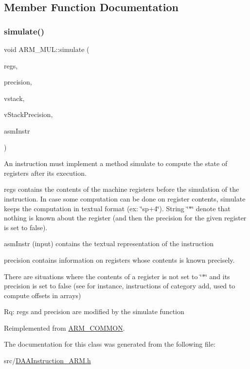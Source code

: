 \subsection{Member Function Documentation}
\mbox{\label{classARM__MUL_a57f827247b5ee156334e9963b3c6bfd4}} 
\subsubsection{\texorpdfstring{simulate()}{simulate()}}
{\footnotesize\ttfamily void A\+R\+M\+\_\+\+M\+U\+L\+::simulate (\begin{DoxyParamCaption}\item[{\hyperlink{DAAInstruction_8h_af0fae93a861de9cf37988d5673cac523}{reg\+Table} \&}]{regs,  }\item[{\hyperlink{DAAInstruction_8h_a0e8cae02815a5f8adc750122d790b455}{reg\+Precision\+Table} \&}]{precision,  }\item[{\hyperlink{DAAInstruction_8h_a1b0e70ac1a04f06c8132055ed01f589f}{stack\+Type} \&}]{vstack,  }\item[{\hyperlink{DAAInstruction_8h_ac5cb793e9dac3fa9693da78b7e29ab30}{stack\+Prec\+Type} \&}]{v\+Stack\+Precision,  }\item[{const string \&}]{asm\+Instr }\end{DoxyParamCaption})\hspace{0.3cm}{\ttfamily [virtual]}}

An instruction must implement a method simulate to compute the state of registers after its execution.

regs contains the contents of the machine registers before the simulation of the instruction. In case some computation can be done on register contents, simulate keeps the computation in textual format (ex\+: \char`\"{}sp+4\char`\"{}). String \char`\"{}$\ast$\char`\"{} denote that nothing is known about the register (and then the precision for the given register is set to false).

asm\+Instr (input) contains the textual representation of the instruction

precision contains information on registers whose contents is known precisely.

There are situations where the contents of a register is not set to \char`\"{}$\ast$\char`\"{} and its precision is set to false (see for instance, instructions of category add, used to compute offsets in arrays)

Rq\+: regs and precision are modified by the simulate function 

Reimplemented from \hyperlink{classARM__COMMON_a89eb552311ce787557a976aee2fa2db6}{A\+R\+M\+\_\+\+C\+O\+M\+M\+ON}.



The documentation for this class was generated from the following file\+:\begin{DoxyCompactItemize}
\item 
src/\hyperlink{DAAInstruction__ARM_8h}{D\+A\+A\+Instruction\+\_\+\+A\+R\+M.\+h}\end{DoxyCompactItemize}
